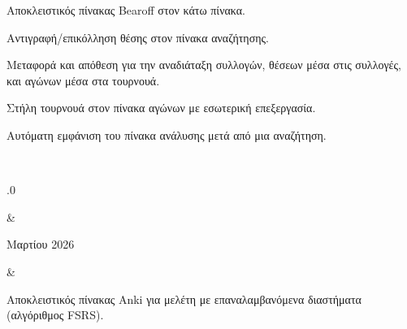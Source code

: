 \documentclass[letterpaper,10pt,greek]{sphinxmanual}
\begin{document}
\begin{savenotes}
\begin{longtable}{}
\begin{varwidth}[t]{}
\sphinxAtStartPar
Αποκλειστικός πίνακας Bearoff στον κάτω πίνακα.

\sphinxAtStartPar
Αντιγραφή/επικόλληση θέσης στον πίνακα αναζήτησης.

\sphinxAtStartPar
Μεταφορά και απόθεση για την αναδιάταξη συλλογών, θέσεων μέσα στις συλλογές, και αγώνων μέσα στα τουρνουά.

\sphinxAtStartPar
Στήλη τουρνουά στον πίνακα αγώνων με εσωτερική επεξεργασία.

\sphinxAtStartPar
Αυτόματη εμφάνιση του πίνακα ανάλυσης μετά από μια αναζήτηση.
\sphinxbeforeendvarwidth
\end{varwidth}%
\\
\sphinxhline\begin{varwidth}[t]{}
.0
\sphinxbeforeendvarwidth
\end{varwidth}%
&\begin{varwidth}[t]{}
 Μαρτίου 2026
\sphinxbeforeendvarwidth
\end{varwidth}%
&\begin{varwidth}[t]{}
\sphinxAtStartPar
Αποκλειστικός πίνακας Anki για μελέτη με επαναλαμβανόμενα διαστήματα (αλγόριθμος FSRS).


\end{varwidth}
\end{longtable}
\end{savenotes}
\end{document}
